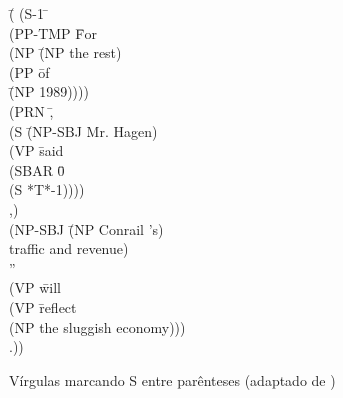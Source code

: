 \begin{figure}[!ht]
    \centering
    \begin{minipage}{10cm}
        \begin{tabbing}
            \=(   (S-1 \=\+\\ 
            \>    (PP-TMP \=For\+\\
            \>		(NP \=(NP the rest)\+\\
            \>			(PP \=of\+\\
            \>				\=(NP 1989))))\-\-\-\-\\
        	\>  (PRN \=,\+\\
            \>		(S \=(NP-SBJ Mr. Hagen) \+\\
            \>	        (VP \=said\+\\
            \>		        (SBAR \=0\+\\
            \>				    (S *T*-1))))\-\-\-\\
            \>		,)\-\\
            \>	(NP-SBJ \=(NP Conrail 's)\+\\
            \>		traffic and revenue)\-\\
            \>	''\\
            \>	(VP \=will\+\\
            \>		(VP \=reflect\+\\
            \>			(NP the sluggish economy)))\-\\
            \>	.))
        \end{tabbing}
    \end{minipage}
    \caption[Vírgulas marcando S entre parênteses]{Vírgulas marcando S entre parênteses (adaptado de )}
    \label{fig:ptb_comma_parenthe}
\end{figure}